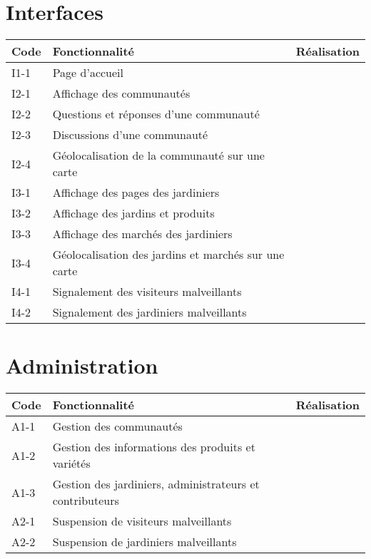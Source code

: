 \documentclass{scrreprt}
\begin{document}
\section{Interfaces}
\begin{tabular}{|l|p{9cm}|r|}
 \hline
 \bfseries Code & \bfseries Fonctionnalité                             & \bfseries Réalisation \\
 \hline
 I1-1           & Page d'accueil                                       &                       \\
 \hline
 I2-1           & Affichage des communautés                            &                       \\
 \hline
 I2-2           & Questions et réponses d'une communauté               &                       \\
 \hline
 I2-3           & Discussions d'une communauté                         &                       \\
 \hline
 I2-4           & Géolocalisation de la communauté sur une carte       &                       \\
 \hline
 I3-1           & Affichage des pages des jardiniers                   &                       \\
 \hline
 I3-2           & Affichage des jardins et produits                    &                       \\
 \hline
 I3-3           & Affichage des marchés des jardiniers                 &                       \\
 \hline
 I3-4           & Géolocalisation des jardins et marchés sur une carte &                       \\
 \hline
 I4-1           & Signalement des visiteurs malveillants               &                       \\
 \hline
 I4-2           & Signalement des jardiniers malveillants              &                       \\
 \hline
\end{tabular}


\section{Administration}
\begin{tabular}{|l|p{9cm}|r|}
 \hline
 \bfseries Code & \bfseries Fonctionnalité                                 & \bfseries Réalisation \\
 \hline
 A1-1           & Gestion des communautés                                  &                       \\
 \hline
 A1-2           & Gestion des informations des produits et variétés        &                       \\
 \hline
 A1-3           & Gestion des jardiniers, administrateurs et contributeurs &                       \\
 \hline
 A2-1           & Suspension de visiteurs malveillants                     &                       \\
 \hline
 A2-2           & Suspension de jardiniers malveillants                    &                       \\
 \hline
\end{tabular}
\end{document}
